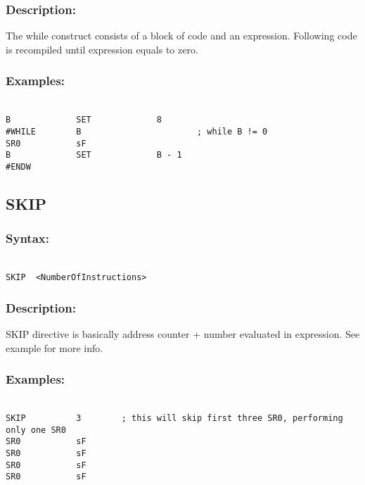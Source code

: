         \subsubsection{Description:}
        The while construct consists of a block of code and an expression. Following code is recompiled until expression equals to zero.

        \subsubsection{Examples:}
        {
                ~\\
                \usecodefont
                \verb'B             SET             8'\\
                \verb'#WHILE        B                       ; while B != 0'\\
                \verb'SR0           sF'\\
                \verb'B             SET             B - 1'\\
                \verb'#ENDW'
        }

    \subsection{SKIP}
        \subsubsection{Syntax:}
        {
            ~\\
            \usecodefont
            \verb'SKIP  <NumberOfInstructions>'
        }
        \subsubsection{Description:}
            SKIP directive is basically address counter + number evaluated in expression. See example for more info.

        \subsubsection{Examples:}
        {
            ~\\
            \usecodefont
            \verb'SKIP          3        ; this will skip first three SR0, performing only one SR0'\\
            \verb'SR0           sF'\\
            \verb'SR0           sF'\\
            \verb'SR0           sF'\\
            \verb'SR0           sF'\\
        }

